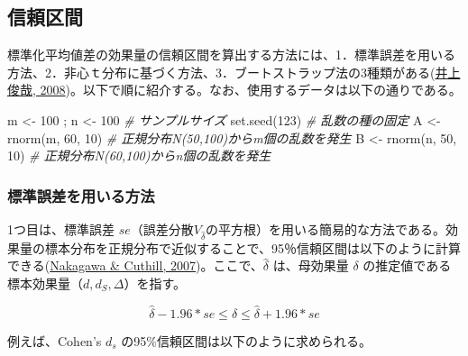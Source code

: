 \documentclass[
  ja=standard, xelatex, base=12pt]{bxjsreport}
\newenvironment{Shaded}{\begin{snugshade}}{\end{snugshade}}
\newcommand{\CommentTok}[1]{\textcolor[rgb]{0.56,0.35,0.01}{\textit{#1}}}
\newcommand{\DecValTok}[1]{\textcolor[rgb]{0.00,0.00,0.81}{#1}}
\newcommand{\FunctionTok}[1]{\textcolor[rgb]{0.00,0.00,0.00}{#1}}
\newcommand{\NormalTok}[1]{#1}
\newcommand{\OtherTok}[1]{\textcolor[rgb]{0.56,0.35,0.01}{#1}}
\begin{document}
\hypertarget{ux4fe1ux983cux533aux9593}{%
\subsection{信頼区間}\label{ux4fe1ux983cux533aux9593}}

標準化平均値差の効果量の信頼区間を算出する方法には、1．標準誤差を用いる方法、2．非心ｔ分布に基づく方法、3．ブートストラップ法の3種類がある(\protect\hyperlink{ref-inoue2008}{井上俊哉, 2008})。以下で順に紹介する。なお、使用するデータは以下の通りである。

\begin{Shaded}
\begin{Highlighting}[]
\NormalTok{m }\OtherTok{\textless{}{-}} \DecValTok{100}\NormalTok{ ; n }\OtherTok{\textless{}{-}} \DecValTok{100}   \CommentTok{\# サンプルサイズ}
\FunctionTok{set.seed}\NormalTok{(}\DecValTok{123}\NormalTok{)         }\CommentTok{\# 乱数の種の固定}
\NormalTok{A }\OtherTok{\textless{}{-}} \FunctionTok{rnorm}\NormalTok{(m, }\DecValTok{60}\NormalTok{, }\DecValTok{10}\NormalTok{) }\CommentTok{\# 正規分布N(50,100)からm個の乱数を発生}
\NormalTok{B }\OtherTok{\textless{}{-}} \FunctionTok{rnorm}\NormalTok{(n, }\DecValTok{50}\NormalTok{, }\DecValTok{10}\NormalTok{) }\CommentTok{\# 正規分布N(60,100)からn個の乱数を発生}
\end{Highlighting}
\end{Shaded}

\hypertarget{ux6a19ux6e96ux8aa4ux5deeux3092ux7528ux3044ux308bux65b9ux6cd5}{%
\subsubsection{標準誤差を用いる方法}\label{ux6a19ux6e96ux8aa4ux5deeux3092ux7528ux3044ux308bux65b9ux6cd5}}

1つ目は、標準誤差 \(se\)（誤差分散\(V_{\hat\delta}\)の平方根）を用いる簡易的な方法である。効果量の標本分布を正規分布で近似することで、95％信頼区間は以下のように計算できる(\protect\hyperlink{ref-nakagawa2007}{Nakagawa \& Cuthill, 2007})。ここで、\(\hat\delta\) は、母効果量 \(\delta\) の推定値である標本効果量（\(d, d_S, \Delta\)）を指す。

\[
\hat{\delta}-1.96*se\leq\delta\leq\hat{\delta}+1.96*se
\]

例えば、Cohen's \(d_s\) の95\%信頼区間は以下のように求められる。
\end{document}
